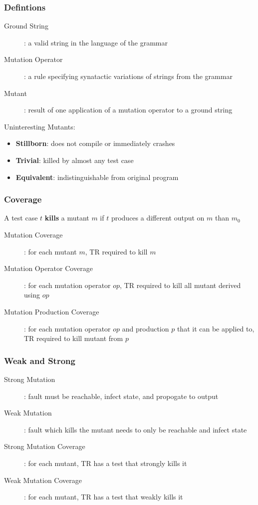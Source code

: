 \documentclass[]{article}
\theoremstyle{definition}
\begin{document}
				\subsubsection{Defintions}
					\begin{description}
						\item[Ground String]: a valid string in the language of the grammar
						\item[Mutation Operator]: a rule specifying synatactic variations of strings from the grammar
						\item[Mutant]: result of one application of a mutation operator to a ground string
					\end{description}
					Uninteresting Mutants:
					\begin{itemize}
						\item \textbf{Stillborn}: does not compile or immediately crashes
						\item \textbf{Trivial}: killed by almost any test case
						\item \textbf{Equivalent}: indistinguishable from original program
					\end{itemize}
				\subsubsection{Coverage}
					A test case $t$ \textbf{kills} a mutant $m$ if $t$ produces a different output on $m$ than $m_0$
					\begin{description}
						\item[Mutation Coverage]: for each mutant $m$, TR required to kill $m$
						\item[Mutation Operator Coverage]: for each mutation operator $op$, TR required to kill all mutant derived using $op$
						\item[Mutation Production Coverage]: for each mutation operator $op$ and production $p$ that it can be applied to, TR required to kill mutant from $p$
					\end{description}
				\subsubsection{Weak and Strong}
					\begin{description}
						\item[Strong Mutation]: fault must be reachable, infect state, and propogate to output
						\item[Weak Mutation]: fault which kills the mutant needs to only be reachable and infect state
						\item[Strong Mutation Coverage]: for each mutant, TR has a test that strongly kills it
						\item[Weak Mutation Coverage]: for each mutant, TR has a test that weakly kills it
					\end{description}
\end{document}
